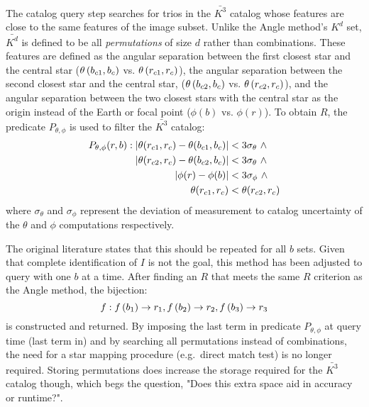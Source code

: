 The catalog query step searches for trios in the $\bar{K^3}$ catalog whose features are close to the same features of
the image subset.
Unlike the Angle method's $K^d$ set, $\bar{K^d}$ is defined to be all \textit{permutations} of size $d$ rather than
combinations.
These features are defined as the angular separation between the first closest star and the central star
($\theta\left(b_{c1}, b_c\right)$ vs. $ \theta\left(r_{c1}, r_c\right)$), the
angular separation between the second closest star and the central star, ($\theta\left(b_{c2},
b_c\right) $ vs. $\theta\left(r_{c2}, r_c\right)$),
and the angular separation between the two closest stars with the central star as the origin instead of the Earth or 
focal point ($\phi(b) $ vs. $ \phi(r)$).
To obtain $R$, the predicate $P_{\theta, \phi}$ is used to filter the $\bar{K^3}$ catalog:
\begin{equation}
    \begin{aligned}
        P_{\theta, \phi} (r, b): \left\lvert \theta(r_{c1}, r_c) - \theta(b_{c1}, b_c)\right\rvert
        &< 3 \sigma_{\theta} \ \land \\ \left\lvert \theta(r_{c2}, r_c) - \theta(b_{c2}, 
        b_c)\right\rvert &< 3 \sigma_{\theta} \ \land \\ \left\lvert \phi(r) - \phi(b)\right\rvert &< 3 
        \sigma_\phi \ \land \\\theta(r_{c1}, r_c) &< \theta(r_{c2}, r_c)
    \end{aligned}
\end{equation}
where $\sigma_{\theta}$ and $\sigma_{\phi}$ represent the deviation of measurement to catalog uncertainty of the
$\theta$ and $\phi$ computations respectively.

The original literature states that this should be repeated for all $b$ sets.
Given that complete identification of $I$ is not the goal, this method has been adjusted to query with one $b$ at a
time.
After finding an $R$ that meets the same $R$ criterion as the Angle method, the bijection:
\begin{equation}
    f: f\left(b_1\right) \rightarrow r_1, f\left(b_2\right) \rightarrow r_2, f\left(b_3\right)
    \rightarrow r_3
\end{equation}
is constructed and returned.
By imposing the last term in predicate $P_{\theta, \phi}$ at query time (last term in) and by searching all
permutations instead of combinations, the need for a star mapping procedure (e.g.\ direct match test) is
no longer required.
Storing permutations does increase the storage required for the $\bar{K^3}$ catalog though, which begs the question,
"Does this extra space aid in accuracy or runtime?".

